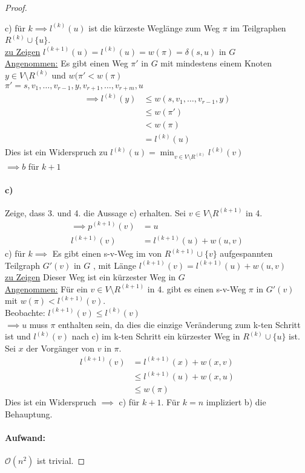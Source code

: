 \begin{proof}
\begin{itemize}[label=$\lozenge$, itemsep=2ex]
c) für $k \implies l^{(k)}(u)$ ist die kürzeste Weglänge zum Weg $\pi$ im Teilgraphen $R^{(k)}\cup \{u\}$. \\
\underline{zu Zeigen} $l^{(k+1)}(u)=l^{(k)}(u)=w(\pi) = \delta(s,u)$ in $G$ \\
\underline{Angenommen:} Es gibt einen Weg $\pi'$ in $G$ mit mindestens einem Knoten $y \in V \setminus R^{(k)}$ und $w(\pi' < w(\pi)$ \\
$\pi' = s,v_1,\ldots,v_{r-1},y,v_{r+1},\ldots,v_{r+m},u$ \\
\begin{align*}
	\implies l^{(k)}(y) &\le  w(s,v_1,\ldots,v_{r-1},y) \\
			    &\le w(\pi') \\
			    &< w (\pi) \\
			    &= l^{(k)}(u)
\end{align*}
Dies ist ein Widerspruch zu $l^{(k)}(u)= \min_{v \in V \setminus R^{(k)}} l^{(k)}(v)$ \\
$\implies b$ für $k+1$
\end{itemize}
\paragraph{c)}
Zeige, dass 3. und 4. die Aussage c) erhalten. Sei $v \in V \setminus R^{(k+1)}$ in 4. \\
\begin{align*}
	\implies p^{(k+1)}(v)&= u \\
	l^{(k+1)}(v) &= l^{\left( k+1 \right)}(u) +w(u,v)
\end{align*}
c) für $k \implies $ Es gibt einen s-v-Weg im von $R^{(k+1)}\cup \{v\} $ aufgespannten Teilgraph $G'(v)$  in $G$ , mit Länge $l^{(k+1)}(v)= l^{(k+1)}(u)+w(u,v)$ \\
\underline{zu Zeigen} Dieser Weg ist ein kürzester Weg in $G$ \\
\underline{Angenommen:} Für ein $v \in V \setminus R^{(k+1)}$ in 4. gibt es einen s-v-Weg $\pi$ in $G'(v)$ mit $w(\pi) < l^{(k+1)}(v)$. \\
Beobachte: $l^{(k+1)}(v) \le l^{(k)}(v)$ \\
$\implies u$ muss $\pi$ enthalten sein, da dies die einzige Veränderung zum k-ten Schritt ist und $l^{(k)}(v)$ nach c) im k-ten Schritt ein kürzester Weg in $R^{(k)}\cup \{u\} $ ist. \\
Sei $x$ der Vorgänger von $v$  in $\pi$. 
\begin{align*}
	l^{(k+1)}(v)&= l^{(k+1)}(x) + w(x,v) \\
		    &\le l^{(k+1)}(u) + w(x,u) \\
		    &\le w(\pi)
\end{align*}
Dies ist ein Widerspruch $\implies $ c) für $k+1$. Für $k=n$ impliziert b) die Behauptung. 
\paragraph{Aufwand:} $\mathcal{O}(n^2)$ ist trivial. 
\end{proof}

